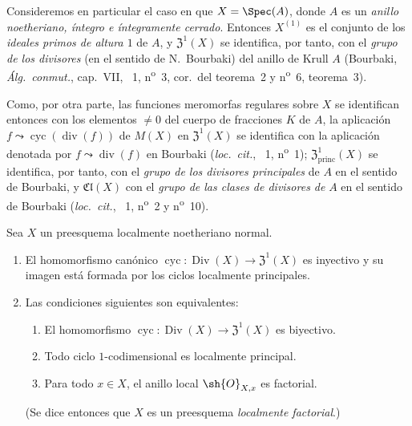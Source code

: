 \begin{env}[21.6.8]
\label{IV.21.6.8}
Consideremos en particular el caso en que $X=\Spec(A)$, donde $A$ es un \emph{anillo noetheriano, íntegro e íntegramente cerrado}.
Entonces $X^{(1)}$ es el conjunto de los \emph{ideales primos de altura $1$} de $A$, y $\mathfrak{Z}^1(X)$ se identifica, por tanto, con el \emph{grupo de los divisores} (en el sentido de N.~Bourbaki) del anillo de Krull $A$ (Bourbaki, \emph{Álg.\ conmut.}, cap.~VII, \textsection~1, n\textsuperscript{o}~3, cor.\ del teorema~2 y n\textsuperscript{o}~6, teorema~3).

Como, por otra parte, las funciones meromorfas regulares sobre $X$ se identifican entonces con los elementos $\neq0$ del cuerpo de fracciones $K$ de $A$, la aplicación $f\leadsto\operatorname{cyc}(\operatorname{div}(f))$ de $M(X)$ en $\mathfrak{Z}^1(X)$ se identifica con la aplicación denotada por $f\leadsto\operatorname{div}(f)$ en Bourbaki (\emph{loc.\ cit.}, \textsection~1, n\textsuperscript{o}~1);
$\mathfrak{Z}^1_\mathrm{princ}(X)$ se identifica, por tanto, con el \emph{grupo de los divisores principales} de $A$ en el sentido de Bourbaki, y $\mathfrak{Cl}(X)$ con el \emph{grupo de las clases de divisores de} $A$ en el sentido de Bourbaki (\emph{loc.\ cit.}, \textsection~1, n\textsuperscript{o}~2 y n\textsuperscript{o}~10).
\end{env}

\begin{theorem}[21.6.9]
\label{IV.21.6.9}
Sea $X$ un preesquema localmente noetheriano \textup{normal}.
\begin{enumerate}[label=\textup{(\roman*)}]
  \item El homomorfismo canónico $\operatorname{cyc}:\operatorname{Div}(X)\to\mathfrak{Z}^1(X)$ es inyectivo y su imagen está formada por los ciclos localmente principales.
  \item Las condiciones siguientes son equivalentes:
  \begin{enumerate}[label=\emph{\alph*)}]
    \item El homomorfismo $\operatorname{cyc}:\operatorname{Div}(X)\to\mathfrak{Z}^1(X)$ es biyectivo.
    \item Todo ciclo $1$-codimensional es localmente principal.
    \item Para todo $x\in X$, el anillo local $\sh{O}_{X,x}$ es factorial.
  \end{enumerate}
  \textup{(Se dice entonces que $X$ es un preesquema \emph{localmente factorial}.)}
\end{enumerate}
\end{theorem}

